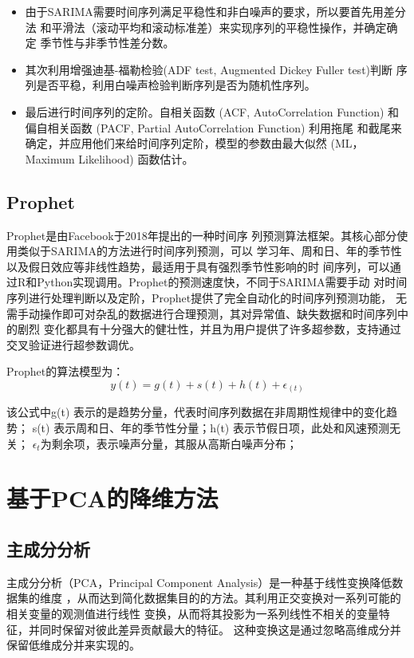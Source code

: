 \documentclass[AutoFakeBold]{LZUThesis}
\begin{document}
\begin{itemize}
\item 由于SARIMA需要时间序列满足平稳性和非白噪声的要求，所以要首先用差分法
和平滑法（滚动平均和滚动标准差）来实现序列的平稳性操作，并确定确定
季节性与非季节性差分数。
\item 其次利用增强迪基-福勒检验(ADF test, Augmented Dickey Fuller test)判断
序列是否平稳，利用白噪声检验判断序列是否为随机性序列。
\item 最后进行时间序列的定阶。自相关函数 (ACF, AutoCorrelation Function)
和偏自相关函数 (PACF, Partial AutoCorrelation Function) 利用拖尾
和截尾来确定，并应用他们来给时间序列定阶，模型的参数由最大似然 (ML，Maximum
Likelihood) 函数估计。
\end{itemize}

\subsection{Prophet}
Prophet\cite{taylor2018forecasting}是由Facebook于2018年提出的一种时间序
列预测算法框架。其核心部分使用类似于SARIMA的方法进行时间序列预测，可以
学习年、周和日、年的季节性以及假日效应等非线性趋势，最适用于具有强烈季节性影响的时
间序列，可以通过R和Python实现调用。Prophet的预测速度快，不同于SARIMA需要手动
对时间序列进行处理判断以及定阶，Prophet提供了完全自动化的时间序列预测功能，
无需手动操作即可对杂乱的数据进行合理预测，其对异常值、缺失数据和时间序列中的剧烈
变化都具有十分强大的健壮性，并且为用户提供了许多超参数，支持通过交叉验证进行超参数调优。

Prophet的算法模型为：
$$y(t)=g(t)+s(t)+h(t)+\epsilon_{(t)}$$

该公式中g(t) 表示的是趋势分量，代表时间序列数据在非周期性规律中的变化趋势；
s(t) 表示周和日、年的季节性分量；h(t) 表示节假日项，此处和风速预测无关；
$\epsilon_{t}$为剩余项，表示噪声分量，其服从高斯白噪声分布；

\section{基于PCA的降维方法}
\subsection{主成分分析}
主成分分析（PCA，Principal Component Analysis）是一种基于线性变换降低数据集的维度
，从而达到简化数据集目的的方法。其利用正交变换对一系列可能的相关变量的观测值进行线性
变换，从而将其投影为一系列线性不相关的变量特征，并同时保留对彼此差异贡献最大的特征。
这种变换这是通过忽略高维成分并保留低维成分并来实现的。
\end{document}
